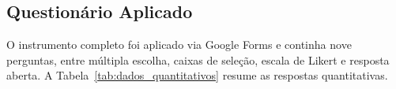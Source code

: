 \documentclass[12pt, oneside, a4paper, chapter=TITLE,section=TITLE]{abntex2}
\begin{document}
\begin{anexosenv}
\partanexos

\chapter{Questionário Aplicado}

O instrumento completo foi aplicado via Google Forms e continha nove perguntas, entre múltipla escolha, caixas de seleção, escala de Likert e resposta aberta. A Tabela~\ref{tab:dados_quantitativos} resume as respostas quantitativas.

\end{anexosenv}

\printindex
\end{document}
